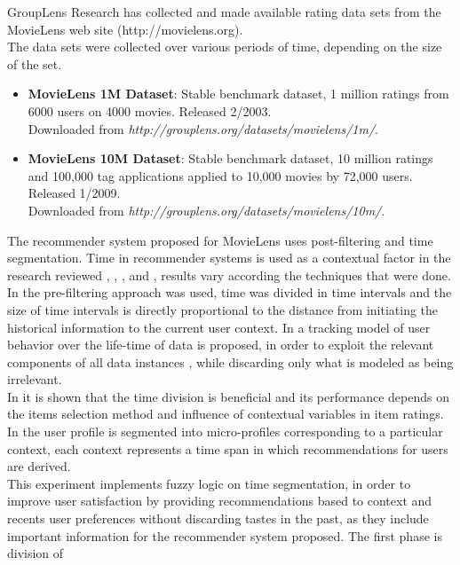 GroupLens Research has collected and made available rating data sets
from the MovieLens  web site (http://movielens.org). \\   The data sets
were collected over various periods of time,  depending on the size of
the set.
\begin{itemize} 
\item \textbf{MovieLens 1M Dataset}: Stable
benchmark dataset, 1 million ratings from 6000 users on 4000 movies.
Released 2/2003.\\ Downloaded from
\textit{http://grouplens.org/datasets/movielens/1m/}. 
\item \textbf{MovieLens
10M Dataset}: Stable benchmark dataset, 10 million ratings and 100,000
tag applications applied to 10,000 movies by 72,000 users. Released
1/2009. \\Downloaded from
\textit{http://grouplens.org/datasets/movielens/10m/}. 
\end{itemize}
The recommender system proposed for MovieLens uses post-filtering 
and time segmentation.
Time in recommender systems is used  as a contextual factor in the
research reviewed \cite{baltrunas2009context},
\cite{baltrunas2009towards}, \cite{koren2010collaborative}, and
\cite{he2009time}, results vary according the techniques that were
done.\\  In \cite{he2009time} the pre-filtering approach was used, time
was divided in time intervals and the size of time intervals is
directly proportional to the distance from initiating the historical
information to the current user context. In
\cite{koren2010collaborative} a tracking model of user behavior over
the life-time of data is proposed, in order to exploit the relevant
components of all  data instances , while discarding only what is
modeled as being irrelevant.\\  In \cite{baltrunas2009context} it is
shown that the time division is beneficial and its performance depends
on the items selection method and influence of contextual variables in
item ratings. In \cite{baltrunas2009towards} the user profile is
segmented into micro-profiles corresponding to a particular context,
each context represents a time span in which recommendations for users
are derived.\\  This experiment implements fuzzy logic on time
segmentation, in order to improve user satisfaction by providing
recommendations based to context and recents user preferences without
discarding tastes in the past, as they include important information
for the recommender system proposed. The first phase is division of
